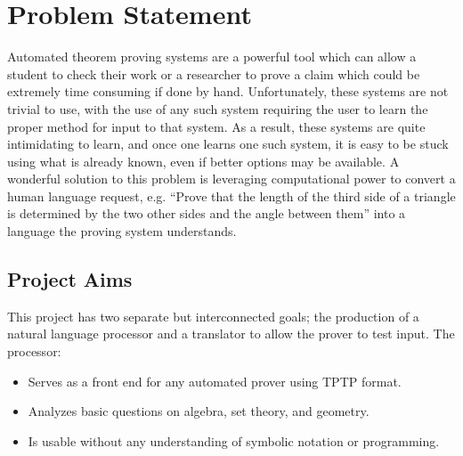 \section{Problem Statement}                                                                           
Automated theorem proving systems are a powerful tool which can allow a student to check their work or a 
researcher to prove a claim which could be extremely time consuming if done by hand. Unfortunately, these
systems are not trivial to use, with the use of any such system requiring the user to learn the proper method for input to that system. As a result, these systems are quite intimidating to learn, and once one learns one such system, it is easy to be stuck using what is already known, even if better options may be available. A wonderful solution to this problem is leveraging computational power to convert a human language request, e.g. ``Prove that the length of the third side of a triangle is determined by the two other sides and the angle between them'' into a language the proving system understands.                     
                                                                                                           
                                                                                                           
  \subsection{Project Aims}                                                                                
This project has two separate but interconnected goals; the production of a natural language processor and a translator to allow the prover to test input. The processor:                                              
  \begin{itemize}                                                                                          
  \item{Serves as a front end for any automated prover using TPTP format.}
  \item{Analyzes basic questions on algebra, set theory, and geometry.}
  \item{Is usable without any understanding of symbolic notation or programming.}                          
    \end{itemize}                                                                                            
                                                                                                           
